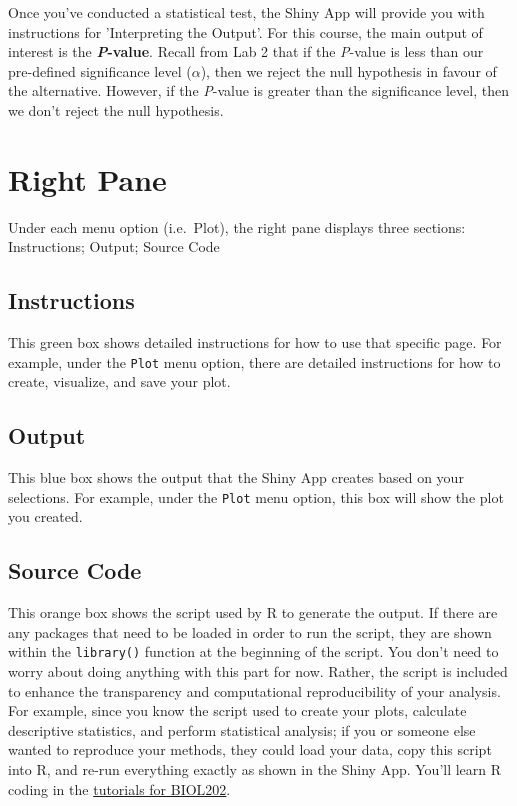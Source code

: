 \documentclass[
]{book}
\begin{document}
Once you've conducted a statistical test, the Shiny App will provide you with instructions for 'Interpreting the Output'. For this course, the main output of interest is the \textbf{\emph{P}-value}. Recall from Lab 2 that if the \emph{P}-value is less than our pre-defined significance level (\(\alpha\)), then we reject the null hypothesis in favour of the alternative. However, if the \emph{P}-value is greater than the significance level, then we don't reject the null hypothesis.

\hypertarget{right-pane}{%
\section*{Right Pane}\label{right-pane}}

Under each menu option (i.e.~Plot), the right pane displays three sections: Instructions; Output; Source Code

\hypertarget{instructions}{%
\subsection*{Instructions}\label{instructions}}

This green box shows detailed instructions for how to use that specific page. For example, under the \texttt{Plot} menu option, there are detailed instructions for how to create, visualize, and save your plot.

\hypertarget{output}{%
\subsection*{Output}\label{output}}

This blue box shows the output that the Shiny App creates based on your selections. For example, under the \texttt{Plot} menu option, this box will show the plot you created.

\hypertarget{source-code}{%
\subsection*{Source Code}\label{source-code}}

This orange box shows the script used by R to generate the output. If there are any packages that need to be loaded in order to run the script, they are shown within the \texttt{library()} function at the beginning of the script. You don't need to worry about doing anything with this part for now. Rather, the script is included to enhance the transparency and computational reproducibility of your analysis. For example, since you know the script used to create your plots, calculate descriptive statistics, and perform statistical analysis; if you or someone else wanted to reproduce your methods, they could load your data, copy this script into R, and re-run everything exactly as shown in the Shiny App. You'll learn R coding in the \href{https://ubco-biology.github.io/BIOL202/}{tutorials for BIOL202}.
\end{document}
